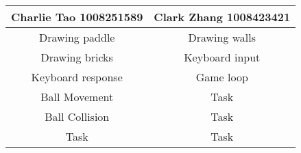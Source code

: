 \documentclass{article}
\begin{document}
\begin{center}
\begin{tabular}{|| c | c ||}
\hline
 Charlie Tao 1008251589 &  Clark Zhang 1008423421 \\ 
 \hline
 Drawing paddle & Drawing walls\\
 \hline
 Drawing bricks & Keyboard input\\
 \hline
 Keyboard response & Game loop\\ 
 \hline
 Ball Movement & Task\\ 
 \hline
 Ball Collision & Task\\
 \hline
 Task & Task\\  
 \hline
\end{tabular}
\end{center}

\end{document}
